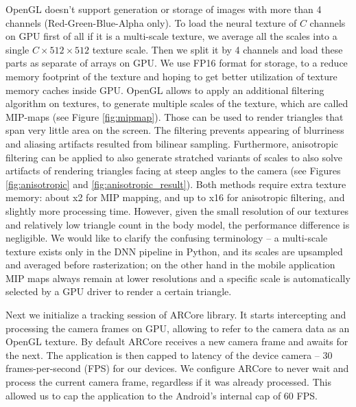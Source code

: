 OpenGL doesn't support generation or storage of images with more than 4 channels (Red-Green-Blue-Alpha only). To load the neural texture of $C$ channels on GPU first of all if it is a multi-scale texture, we average all the scales into a single $C \times 512 \times 512$ texture scale. Then we split it by 4 channels and load these parts as separate of arrays on GPU. We use FP16 format for storage, to a reduce memory footprint of the texture and hoping to get better utilization of texture memory caches inside GPU. OpenGL allows to apply an additional filtering algorithm on textures, to generate multiple scales of the texture, which are called MIP-maps (see Figure \ref{fig:mipmap}). Those can be used to render triangles that span very little area on the screen. The filtering prevents appearing of blurriness and aliasing artifacts resulted from bilinear sampling. Furthermore, anisotropic filtering can be applied to also generate stratched variants of scales to also solve artifacts of rendering triangles facing at steep angles to the camera (see Figures \ref{fig:anisotropic} and \ref{fig:anisotropic_result}). Both methods require extra texture memory: about x2 for MIP mapping, and up to x16 for anisotropic filtering, and slightly more processing time. However, given the small resolution of our textures and relatively low triangle count in the body model, the performance difference is negligible. We would like to clarify the confusing terminology -- a multi-scale texture exists only in the DNN pipeline in Python, and its scales are upsampled and averaged before rasterization; on the other hand in the mobile application MIP maps always remain at lower resolutions and a specific scale is automatically selected by a GPU driver to render a certain triangle.

Next we initialize a tracking session of ARCore library. It starts intercepting and processing the camera frames on GPU, allowing to refer to the camera data as an OpenGL texture. By default ARCore receives a new camera frame and awaits for the next. The application is then capped to latency of the device camera -- 30 frames-per-second (FPS) for our devices. We configure ARCore to never wait and process the current camera frame, regardless if it was already processed. This allowed us to cap the application to the Android's internal cap of 60 FPS.

